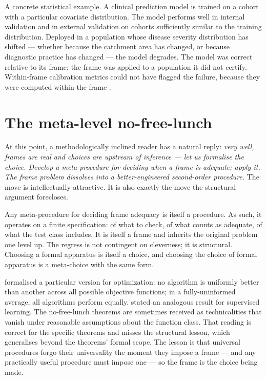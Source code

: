 \documentclass[11pt,a4paper]{article}
\begin{document}
A concrete statistical example. A clinical prediction model is trained
on a cohort with a particular covariate distribution. The model performs
well in internal validation and in external validation on cohorts
sufficiently similar to the training distribution. Deployed in a
population whose disease severity distribution has shifted --- whether
because the catchment area has changed, or because diagnostic practice
has changed --- the model degrades. The model was correct relative to its
frame; the frame was applied to a population it did not certify.
Within-frame calibration metrics could not have flagged the failure,
because they were computed within the frame
\citep{Steyerberg2009,Riley2019}.

\section{The meta-level no-free-lunch}
\label{sec:nfl}

At this point, a methodologically inclined reader has a natural reply:
\emph{very well, frames are real and choices are upstream of inference ---
let us formalise the choice. Develop a meta-procedure for deciding when a
frame is adequate; apply it. The frame problem dissolves into a
better-engineered second-order procedure.} The move is intellectually
attractive. It is also exactly the move the structural argument
forecloses.

Any meta-procedure for deciding frame adequacy is itself a procedure. As
such, it operates on a finite specification: of what to check, of what
counts as adequate, of what the test class includes. It is itself a frame
and inherits the original problem one level up. The regress is not
contingent on cleverness; it is structural. Choosing a formal apparatus
is itself a choice, and choosing the choice of formal apparatus is a
meta-choice with the same form.

\citet{WolpertMacready1997} formalised a particular version for
optimization: no algorithm is uniformly better than another across all
possible objective functions; in a fully-uninformed average, all
algorithms perform equally. \citet{Wolpert1996} stated an analogous
result for supervised learning. The no-free-lunch theorems are sometimes
received as technicalities that vanish under reasonable assumptions about
the function class. That reading is correct for the specific theorems and
misses the structural lesson, which generalises beyond the theorems'
formal scope. The lesson is that universal procedures forgo their
universality the moment they impose a frame --- and any practically useful
procedure must impose one --- so the frame is the choice being made.
\end{document}
